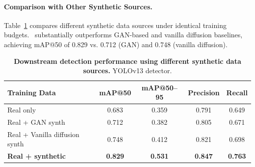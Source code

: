 \documentclass[journal]{IEEEtran}
\begin{document}
\begin{table}[H]
\centering
\caption{Real versus synthetic data augmentation comparison.}
\label{tab:real_vs_synth}
\end{table}

\paragraph{Comparison with Other Synthetic Sources.}
Table~\ref{tab:sources} compares different synthetic data sources under identical training budgets. \method~substantially outperforms GAN-based and vanilla diffusion baselines, achieving mAP@50 of 0.829 vs. 0.712 (GAN) and 0.748 (vanilla diffusion).

\begin{table}[t]
\centering
\caption{\textbf{Downstream detection performance using different synthetic data sources.} YOLOv13 detector.}
\label{tab:sources}
\begin{tabular}{lcccc}
\toprule
Training Data & mAP@50 & mAP@50--95 & Precision & Recall \\
\midrule
Real only & 0.683 & 0.359 & 0.791 & 0.649 \\
Real + GAN synth & 0.712 & 0.382 & 0.805 & 0.671 \\
Real + Vanilla diffusion synth & 0.748 & 0.412 & 0.821 & 0.698 \\
\textbf{Real + \method{} synthetic} & \textbf{0.829} & \textbf{0.531} & \textbf{0.847} & \textbf{0.763} \\
\bottomrule
\end{tabular}
\end{table}
\end{document}
